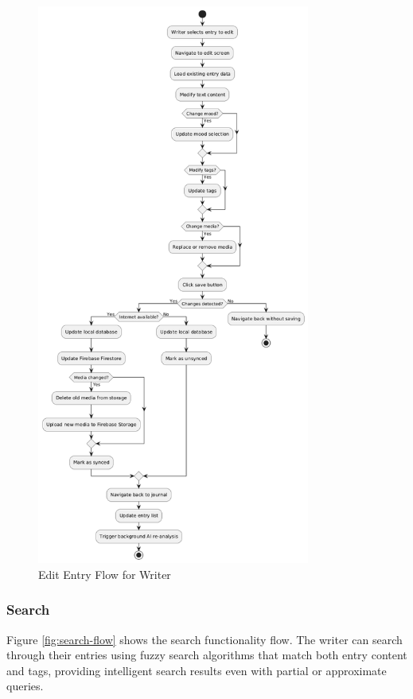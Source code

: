 \begin{figure}[H]
\centering
\includegraphics[width=0.8\textwidth]{files/imgs/edit_entry_flow.png}
\caption{Edit Entry Flow for Writer}
\label{fig:edit-entry-flow}
\end{figure}

\subsubsection{Search}\label{subsubsec:search}

Figure \ref{fig:search-flow} shows the search functionality flow. The writer can search through their entries using fuzzy search algorithms that match both entry content and tags, providing intelligent search results even with partial or approximate queries.

